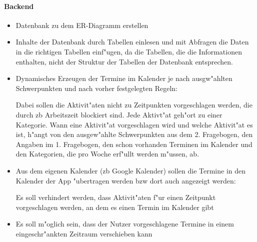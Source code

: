 \documentclass{article}
\begin{document}
\paragraph{Backend}
\begin{itemize}
\item Datenbank zu dem ER-Diagramm erstellen
\item Inhalte der Datenbank durch Tabellen einlesen und mit Abfragen die Daten in die richtigen Tabellen einf"ugen, da die Tabellen, die die Informationen enthalten, nicht der Struktur der Tabellen der Datenbank entsprechen. 
\item Dynamisches Erzeugen der Termine im Kalender je nach ausgw"ahlten Schwerpunkten und nach vorher festgelegten Regeln: 

Dabei sollen die Aktivit"aten nicht zu Zeitpunkten vorgeschlagen werden, die durch zb Arbeitszeit blockiert sind. Jede Aktivt"at geh"ort zu einer Kategorie. Wann eine Aktivit"at vorgeschlagen wird und welche Aktivit"at es ist, h"angt von den ausgew"ahlte Schwerpunkten aus dem 2. Fragebogen, den Angaben im 1. Fragebogen, den schon vorhanden Terminen im Kalender und den Kategorien, die pro Woche erf"ullt werden m"ussen, ab.
\item Aus dem eigenen Kalender (zb Google Kalender) sollen die Termine in den Kalender der App "ubertragen werden bzw dort auch angezeigt werden: 

Es soll verhindert werden, dass Aktivit"aten f"ur einen Zeitpunkt vorgeschlagen werden, an dem es einen Termin im Kalender gibt
\item Es soll m"oglich sein, dass der Nutzer vorgeschlagene Termine in einem eingeschr"ankten Zeitraum verschieben kann

\end{itemize}
\end{document}
